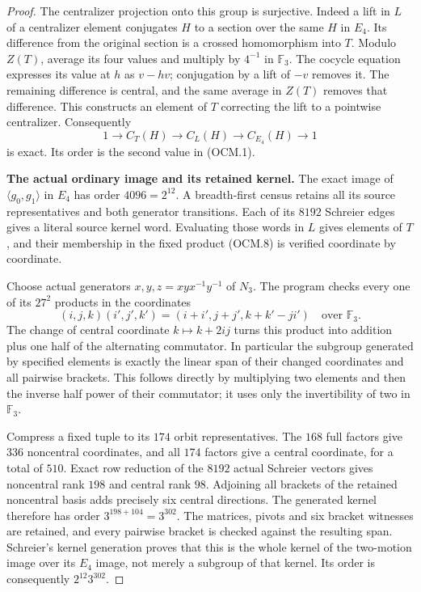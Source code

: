 \begin{proof}
The centralizer projection onto this group is
surjective.  Indeed a lift in $L$ of a centralizer
element conjugates $H$ to a section over the same
$H$ in $E_4$.  Its difference from the original
section is a crossed homomorphism into $T$.
Modulo $Z(T)$, average its four values and multiply
by $4^{-1}$ in $\mathbb F_3$.
The cocycle equation expresses its value at $h$ as
$v-hv$; conjugation by a lift of $-v$ removes it.
The remaining difference is central, and the same
average in $Z(T)$ removes that difference.
This constructs an element of $T$ correcting the
lift to a pointwise centralizer.  Consequently
\[
 1\longrightarrow C_T(H)\longrightarrow C_L(H)
            \longrightarrow C_{E_4}(H)\longrightarrow1
                                                               \tag{OCM.9}
\]
is exact.  Its order is the second value in (OCM.1).

\par\medskip\noindent\textbf{The actual ordinary image and its retained kernel.}\quad
The exact image of $\langle g_0,g_1\rangle$ in $E_4$
has order $4096=2^{12}$.  A breadth-first census
retains all its source representatives and both
generator transitions.  Each of its $8192$ Schreier
edges gives a literal source kernel word.
Evaluating those words in $L$ gives elements of $T$,
and their membership in the fixed product (OCM.8)
is verified coordinate by coordinate.

Choose actual generators $x,y,z=xyx^{-1}y^{-1}$ of $N_3$.
The program checks every one of its $27^2$ products
in the coordinates
\[
 (i,j,k)(i',j',k')
       =(i+i',j+j',k+k'-ji')\quad\text{over }\mathbb F_3.
                                                               \tag{OCM.10}
\]
The change of central coordinate $k\mapsto k+2ij$
turns this product into addition plus one half of
the alternating commutator.  In particular the
subgroup generated by specified elements is exactly
the linear span of their changed coordinates and
all pairwise brackets.  This follows directly by
multiplying two elements and then the inverse half
power of their commutator; it uses only the
invertibility of two in $\mathbb F_3$.

Compress a fixed tuple to its $174$ orbit
representatives.  The $168$ full factors give
$336$ noncentral coordinates, and all $174$ factors
give a central coordinate, for a total of $510$.
Exact row reduction of the $8192$ actual Schreier
vectors gives noncentral rank $198$ and central
rank $98$.  Adjoining all brackets of the retained
noncentral basis adds precisely six central
directions.  The generated kernel therefore has
order $3^{198+104}=3^{302}$.
The matrices, pivots and six bracket witnesses are
retained, and every pairwise bracket is checked
against the resulting span.
Schreier's kernel generation proves that this is
the whole kernel of the two-motion image over
its $E_4$ image, not merely a subgroup of that kernel.
Its order is consequently $2^{12}3^{302}$.


\end{proof}

